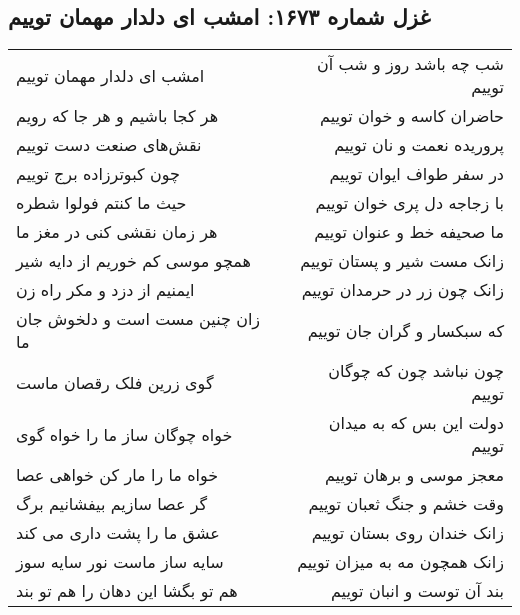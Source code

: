 \begin{center}
\section*{غزل شماره ۱۶۷۳: امشب ای دلدار مهمان توییم}
\label{sec:1673}
\begin{longtable}{l p{0.5cm} r}
امشب ای دلدار مهمان توییم
&&
شب چه باشد روز و شب آن توییم
\\
هر کجا باشیم و هر جا که رویم
&&
حاضران کاسه و خوان توییم
\\
نقش‌های صنعت دست توییم
&&
پروریده نعمت و نان توییم
\\
چون کبوترزاده برج توییم
&&
در سفر طواف ایوان توییم
\\
حیث ما کنتم فولوا شطره
&&
با زجاجه دل پری خوان توییم
\\
هر زمان نقشی کنی در مغز ما
&&
ما صحیفه خط و عنوان توییم
\\
همچو موسی کم خوریم از دایه شیر
&&
زانک مست شیر و پستان توییم
\\
ایمنیم از دزد و مکر راه زن
&&
زانک چون زر در حرمدان توییم
\\
زان چنین مست است و دلخوش جان ما
&&
که سبکسار و گران جان توییم
\\
گوی زرین فلک رقصان ماست
&&
چون نباشد چون که چوگان توییم
\\
خواه چوگان ساز ما را خواه گوی
&&
دولت این بس که به میدان توییم
\\
خواه ما را مار کن خواهی عصا
&&
معجز موسی و برهان توییم
\\
گر عصا سازیم بیفشانیم برگ
&&
وقت خشم و جنگ ثعبان توییم
\\
عشق ما را پشت داری می کند
&&
زانک خندان روی بستان توییم
\\
سایه ساز ماست نور سایه سوز
&&
زانک همچون مه به میزان توییم
\\
هم تو بگشا این دهان را هم تو بند
&&
بند آن توست و انبان توییم
\\
\end{longtable}
\end{center}
